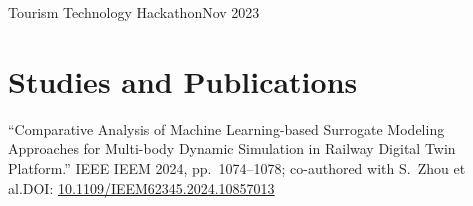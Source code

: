 \documentclass{ExpressiveResume}
\begin{document}
{Tourism Technology Hackathon}{Nov 2023}{}
{
}


\section{Studies and Publications}
{
\noindent ``Comparative Analysis of Machine Learning-based Surrogate Modeling Approaches for Multi-body Dynamic Simulation in Railway Digital Twin Platform.'' IEEE IEEM 2024, pp.~1074--1078; co-authored with S.~Zhou et al.\newline DOI: \href{https://doi.org/10.1109/IEEM62345.2024.10857013}{10.1109/IEEM62345.2024.10857013}
}





\end{document}
